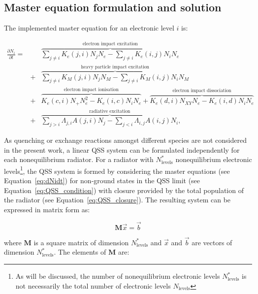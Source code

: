 {\subsection{Master equation formulation and solution}

The implemented master equation for an electronic level $i$ is:

\begin{eqnarray}
  \frac{\partial N_{i}}{\partial t} =&& \overbrace{\sum_{j \neq i} K_{e}(j,i)N_{j}N_{e} - \sum_{j \neq i} K_{e} (i,j)N_{i}N_{e} }^{\text{electron impact excitation}} \nonumber \\
 &+& \overbrace{\sum_{j \neq i} K_{M}(j,i)N_{j}N_{M} - \sum_{j \neq i} K_{M} (i,j)N_{i}N_{M} }^{\text{heavy particle impact excitation}} \nonumber \\
 &+& \overbrace{ K_{e}(c,i)N_{+}N_{e}^{2} - K_{e}(i,c)N_{i}N_{e} }^{\text{electron impact ionisation}} + \overbrace{ K_{e}(d,i)N_{XY}N_{e} - K_{e}(i,d)N_{i}N_{e} }^{\text{electron impact dissociation}} \nonumber \\
 &+& \overbrace{ \sum_{j > i} \Lambda_{j,i} A(j,i)N_{j} - \sum_{j < i} \Lambda_{i,j}A(i,j)N_{i} }^{\text{radiative excitation}}, \label{eq:dNidt}
\end{eqnarray}

As quenching or exchange reactions amongst different species are not considered in the present work, a linear QSS system can be formulated independently for each nonequilibrium radiator.
For a radiator with $N_\text{levels}^\ast$ nonequilibrium electronic levels\footnote{As will be discussed, the number of nonequilibrium electronic levels $N_\text{levels}^\ast$ is not necessarily the total number of electronic levels $N_\text{levels}$}, the QSS system is formed by considering the master equations (see Equation~\ref{eq:dNidt}) for non-ground states in the QSS limit (see Equation~\ref{eq:QSS_condition}) with closure provided by the total population of the radiator (see Equation~\ref{eq:QSS_closure}).
The resulting system can be expressed in matrix form as:

\begin{equation}
 \boldsymbol{M} \vec{x} = \vec{b} \label{eq:Mx_b}
\end{equation}

\noindent where $\boldsymbol{M}$ is a square matrix of dimension $N_\text{levels}^\ast$ and $\vec{x}$ and $\vec{b}$ are vectors of dimension $N_\text{levels}^\ast$.
The elements of $\boldsymbol{M}$ are:

}
